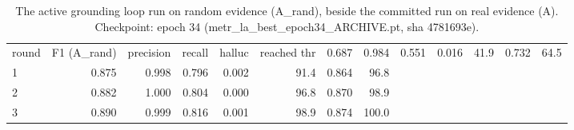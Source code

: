 \begin{table}[t]
\centering
\caption{The active grounding loop run on random evidence (A\_rand), beside the committed run on real evidence (A). Checkpoint: epoch 34 (metr\_la\_best\_epoch34\_ARCHIVE.pt, sha 4781693e).}
\label{tab:loop_on_noise}
\begin{tabular}{lrrrrrrr}
\toprule
round & F1 (A_rand) & precision & recall & halluc & reached thr %
 & 0.687 & 0.984 & 0.551 & 0.016 & 41.9 & 0.732 & 64.5 \\
1 & 0.875 & 0.998 & 0.796 & 0.002 & 91.4 & 0.864 & 96.8 \\
2 & 0.882 & 1.000 & 0.804 & 0.000 & 96.8 & 0.870 & 98.9 \\
3 & 0.890 & 0.999 & 0.816 & 0.001 & 98.9 & 0.874 & 100.0 \\
\bottomrule
\end{tabular}
\end{table}
